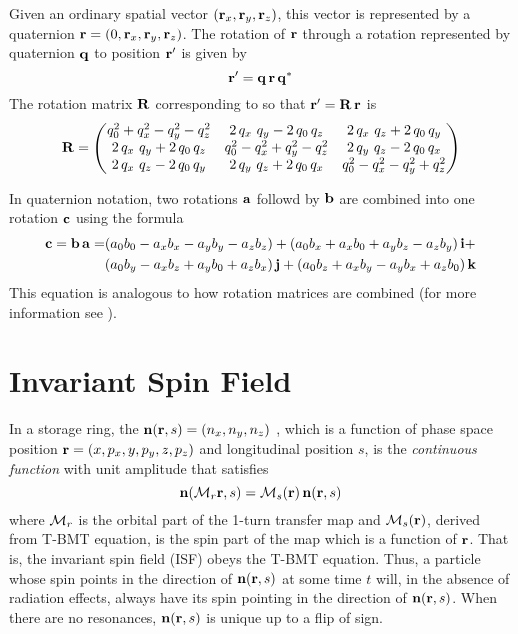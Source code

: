 Given an ordinary spatial vector $({\bf r}_x, {\bf r}_y, {\bf r}_z)$, this vector is represented by a
quaternion ${\bf r} = (0, {\bf r}_x, {\bf r}_y, {\bf r}_z)$. The rotation of ${\bf r}$ through a rotation
represented by quaternion ${\bf q}$ to position ${\bf r}'$ is given by
\begin{equation}
  {\bf r}' = {\bf q} \, {\bf r} \, {\bf q}^*
  \label{rqrq}
\end{equation}
The rotation matrix ${\bf R}$ corresponding to  so that ${\bf r}' = {\bf R} \, {\bf r}$ is
\begin{equation}
  {\bf R} = \begin{pmatrix}
    q_0^2 + q_x^2 - q_y^2 - q_z^2    & 2 \, q_x \ q_y - 2 \, q_0 \, q_z & 2 \, q_x \ q_z + 2 \, q_0 \, q_y \\
    2 \, q_x \ q_y + 2 \, q_0 \, q_z & q_0^2 - q_x^2 + q_y^2 - q_z^2    & 2 \, q_y \ q_z - 2 \, q_0 \, q_x \\
    2 \, q_x \ q_z - 2 \, q_0 \, q_y & 2 \, q_y \ q_z + 2 \, q_0 \, q_x & q_0^2 - q_x^2 - q_y^2 + q_z^2 
  \end{pmatrix}
  \label{rqqq}
\end{equation}

In quaternion notation, two rotations ${\bf a}$ followd by ${\bf b}$ are combined into one rotation ${\bf c}$
using the formula
\begin{align}
  {\bf c} = {\bf b} \, {\bf a} = &(a_0 b_0 - a_x b_x - a_y b_y - a_z b_z) +
                          (a_0 b_x + a_x b_0 + a_y b_z - a_z b_y) \, {\bf i} + \\
                         &(a_0 b_y - a_x b_z + a_y b_0 + a_z b_x) \, {\bf j} +
                          (a_0 b_z + a_x b_y - a_y b_x + a_z b_0) \, {\bf k} \nonumber
\end{align}
This equation is analogous to how rotation matrices are combined (for more information see
\cite{b:quat}).

\section{Invariant Spin Field}
\label{s:isf}

In a storage ring, the  ${\bf n}({\bf r}, s) = (n_x, n_y, n_z)$
\cite{b:spin.hoff,b:duan15}, which is a function of phase space position ${\bf r} = (x, p_x, y, p_y, z,
p_z)$ and longitudinal position $s$, is the {\em continuous function} with unit amplitude that
satisfies
\begin{equation}
  {\bf n}({\cal M}_r {\bf r}, s) = {\cal M}_s({\bf r}) \, {\bf n}({\bf r}, s)
  \label{nmrs}
\end{equation}
where ${\cal M}_r$ is the orbital part of the 1-turn transfer map and ${\cal M}_s({\bf r})$, derived from
T-BMT equation, is the spin part of the map which is a function of ${\bf r}$. That is, the invariant
spin field (ISF) obeys the T-BMT equation. Thus, a particle whose spin points in the direction of
${\bf n}({\bf r}, s)$ at some time $t$ will, in the absence of radiation effects, always have its spin
pointing in the direction of ${\bf n}({\bf r}, s)$. When there are no resonances, ${\bf n}({\bf r}, s)$ is
unique up to a flip of sign.

